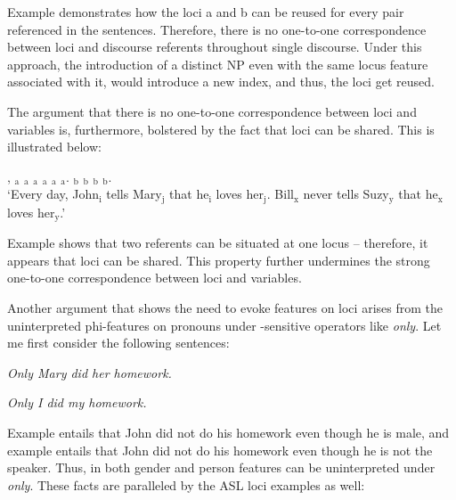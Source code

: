 \documentclass[output=paper,
modfonts
]{langscibook}
\begin{document}
Example  demonstrates how the loci a and b can be reused for every pair referenced in the sentences. Therefore, there is no one-to-one correspondence between loci and discourse referents throughout single discourse. Under this approach, the introduction of a distinct NP even with the same locus feature associated with it, would introduce a new index, and thus, the loci get reused. 

The argument that there is no one-to-one correspondence between loci and variables is, furthermore, bolstered by the fact that loci can be shared. This is illustrated below: 

\begin{exe} 
	\ex \label{ex:irani:69} , $_\text{a}$ $_\text{a}$  $_\text{a}$ $_\text{a}$ $_\text{a}$  $_\text{a}$. $_\text{b}$ $_\text{b}$ $_\text{b}$  $_\text{b}$. \\
	`Every day, John$_\text{i}$ tells Mary$_\text{j}$ that he$_\text{i}$ loves her$_\text{j}$. Bill$_\text{x}$ never tells Suzy$_\text{y}$ that he$_\text{x}$ loves her$_\text{y}$.’  
\end{exe} 

Example  shows that two referents can be situated at one locus -- therefore, it appears that loci can be shared. This property further undermines the strong one-to-one correspondence between loci and variables.  

Another argument that shows the need to evoke features on loci arises from the uninterpreted phi-features on pronouns under -sensitive operators like \textit{only}. Let me first consider the following  sentences: 

\begin{exe} 
	\ex \begin{xlist}
		\ex \label{ex:irani:70} \textit{Only Mary did her homework.}
		
		\ex \label{ex:irani:71} \textit{Only I did my homework.}
	    \end{xlist} 
\end{exe} 

Example  entails that John did not do his homework even though he is male, and example  entails that John did not do his homework even though he is not the speaker. Thus, in  both gender and person features can be uninterpreted under \textit{only}. These facts are paralleled by the ASL loci examples as well: \newpage
\end{document}
